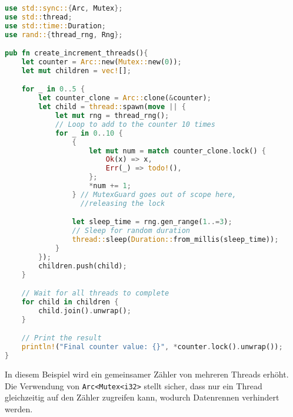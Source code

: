 \begin{lstlisting}[language=Rust, caption=Sicheres Erstellen von Threads ]
use std::sync::{Arc, Mutex};
use std::thread;
use std::time::Duration;
use rand::{thread_rng, Rng}; 

pub fn create_increment_threads(){
    let counter = Arc::new(Mutex::new(0));
    let mut children = vec![];

    for _ in 0..5 {
        let counter_clone = Arc::clone(&counter);
        let child = thread::spawn(move || {
            let mut rng = thread_rng(); 
            // Loop to add to the counter 10 times
            for _ in 0..10 { 
                {
                    let mut num = match counter_clone.lock() {
                        Ok(x) => x,
                        Err(_) => todo!(),
                    };
                    *num += 1;
                } // MutexGuard goes out of scope here, 
                  //releasing the lock

                let sleep_time = rng.gen_range(1..=3); 
                // Sleep for random duration
                thread::sleep(Duration::from_millis(sleep_time)); 
            }
        });
        children.push(child);
    }

    // Wait for all threads to complete
    for child in children {
        child.join().unwrap();
    }

    // Print the result
    println!("Final counter value: {}", *counter.lock().unwrap());
}
\end{lstlisting}
\noindent
In diesem Beispiel wird ein gemeinsamer Zähler von mehreren Threads erhöht. 
Die Verwendung von \texttt{Arc<Mutex<i32>} stellt sicher, dass nur ein Thread gleichzeitig auf den Zähler zugreifen kann, wodurch Datenrennen verhindert werden.
